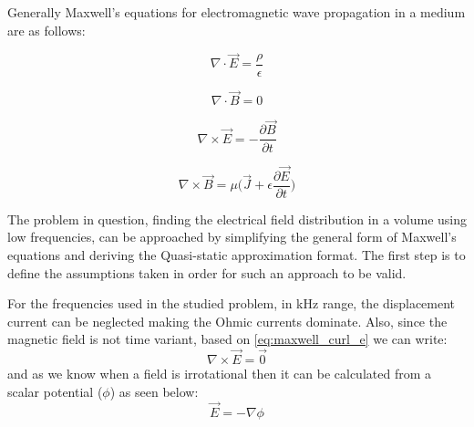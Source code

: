 Generally Maxwell's equations for electromagnetic wave propagation in a medium are as follows:
\begin{center}
\begin{minipage}{.35\linewidth}
    \begin{equation}
        \nabla\cdot\vec{E}=\dfrac{\rho}{\epsilon}
    \end{equation}
\end{minipage}
\begin{minipage}{.35\linewidth}
    \begin{equation}
        \nabla\cdot\vec{B} = 0
    \end{equation}
\end{minipage}\break
\begin{minipage}{.35\linewidth}
    \begin{equation}
        \label{eq:maxwell_curl_e}
        \nabla\times\vec{E}=-\dfrac{\partial\vec{B}}{\partial t}
    \end{equation}
\end{minipage}
\begin{minipage}{.35\linewidth}
    \begin{equation}
        \nabla\times\vec{B} = \mu\Bigg(\vec{J} + \epsilon\dfrac{\partial\vec{E}}{\partial t}\Bigg)
    \end{equation}
\end{minipage}
\end{center}

\noindent The problem in question, finding the electrical field distribution in a volume using low frequencies, can be approached by simplifying the general form of Maxwell's equations and deriving the Quasi-static approximation format. The first step is to define the assumptions taken in order for such an approach to be valid.

For the frequencies used in the studied problem, in \si{kHz} range, the displacement current can be neglected making the Ohmic currents dominate. Also, since the magnetic field is not time variant, based on \autoref{eq:maxwell_curl_e} we can write:
\begin{equation}
    \label{eq:curl_zero_e_field}
    \nabla\times\vec{E} = \vec{0}
\end{equation}
and as we know when a field is irrotational then it can be calculated from a scalar potential ($\phi$) as seen below:
\begin{equation}
    \label{eq:e_field_from_potential}
    \boxed{\vec{E} = -\nabla\phi}
\end{equation}


